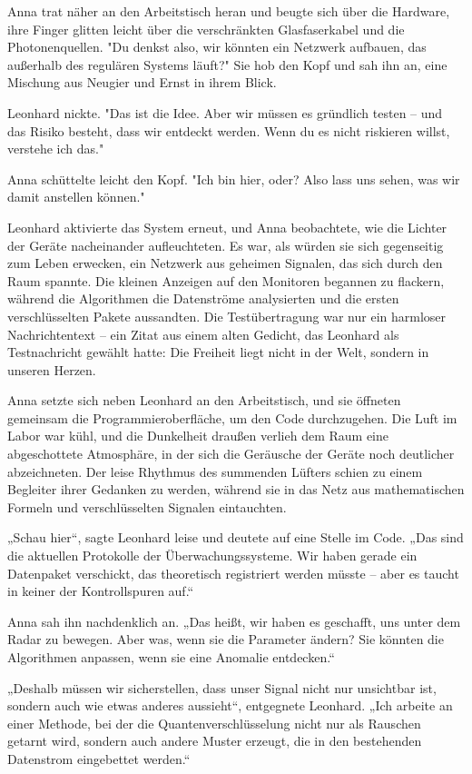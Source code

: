 \documentclass[
]{article}
\begin{document}
Anna trat näher an den Arbeitstisch heran und beugte sich über die
Hardware, ihre Finger glitten leicht über die verschränkten
Glasfaserkabel und die Photonenquellen. "Du denkst also, wir könnten ein
Netzwerk aufbauen, das außerhalb des regulären Systems läuft?" Sie hob
den Kopf und sah ihn an, eine Mischung aus Neugier und Ernst in ihrem
Blick.

Leonhard nickte. "Das ist die Idee. Aber wir müssen es gründlich testen
-- und das Risiko besteht, dass wir entdeckt werden. Wenn du es nicht
riskieren willst, verstehe ich das."

Anna schüttelte leicht den Kopf. "Ich bin hier, oder? Also lass uns
sehen, was wir damit anstellen können."

Leonhard aktivierte das System erneut, und Anna beobachtete, wie die
Lichter der Geräte nacheinander aufleuchteten. Es war, als würden sie
sich gegenseitig zum Leben erwecken, ein Netzwerk aus geheimen Signalen,
das sich durch den Raum spannte. Die kleinen Anzeigen auf den Monitoren
begannen zu flackern, während die Algorithmen die Datenströme
analysierten und die ersten verschlüsselten Pakete aussandten. Die
Testübertragung war nur ein harmloser Nachrichtentext -- ein Zitat aus
einem alten Gedicht, das Leonhard als Testnachricht gewählt hatte: Die
Freiheit liegt nicht in der Welt, sondern in unseren Herzen.

Anna setzte sich neben Leonhard an den Arbeitstisch, und sie öffneten
gemeinsam die Programmieroberfläche, um den Code durchzugehen. Die Luft
im Labor war kühl, und die Dunkelheit draußen verlieh dem Raum eine
abgeschottete Atmosphäre, in der sich die Geräusche der Geräte noch
deutlicher abzeichneten. Der leise Rhythmus des summenden Lüfters schien
zu einem Begleiter ihrer Gedanken zu werden, während sie in das Netz aus
mathematischen Formeln und verschlüsselten Signalen eintauchten.

„Schau hier``, sagte Leonhard leise und deutete auf eine Stelle im Code.
„Das sind die aktuellen Protokolle der Überwachungssysteme. Wir haben
gerade ein Datenpaket verschickt, das theoretisch registriert werden
müsste -- aber es taucht in keiner der Kontrollspuren auf.``

Anna sah ihn nachdenklich an. „Das heißt, wir haben es geschafft, uns
unter dem Radar zu bewegen. Aber was, wenn sie die Parameter ändern? Sie
könnten die Algorithmen anpassen, wenn sie eine Anomalie entdecken.``

„Deshalb müssen wir sicherstellen, dass unser Signal nicht nur
unsichtbar ist, sondern auch wie etwas anderes aussieht``, entgegnete
Leonhard. „Ich arbeite an einer Methode, bei der die
Quantenverschlüsselung nicht nur als Rauschen getarnt wird, sondern auch
andere Muster erzeugt, die in den bestehenden Datenstrom eingebettet
werden.``
\end{document}
